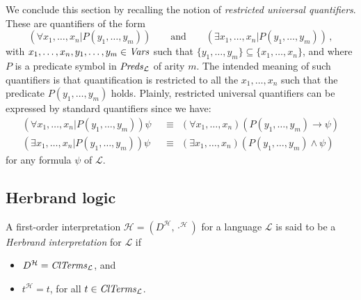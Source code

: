 \documentclass[a4paper]{llncs}
\newcommand{\Lang}{\ensuremath{\mathcal{L}\xspace}} %
\newcommand{\LangPreds}{\Preds_{\Lang}}
\newcommand{\LangClTerms}{\ClTerms_{\Lang}}
\newcommand{\hinter}{\ensuremath{\mathcal{H}}}
\begin{document}
We conclude this section by recalling the notion of \emph{restricted 
universal quantifiers}. These are quantifiers of the form
\[
  (\forall x_1, \ldots, x_n | P(y_1, \ldots, y_m)) \qquad \text{and} 
\qquad (\exists x_1, \ldots, x_n | P(y_1, \ldots, y_m))\,,
\]
with $x_1, \ldots, x_n, y_1, \ldots, y_m \in \mathit{Vars}$ such that
$\{y_1, \ldots, y_m\}\subseteq\{x_1, \ldots, x_n\}$,
and where $P$ is a predicate symbol in $\LangPreds$ of arity $m$.
%
The intended meaning of such quantifiers is that
quantification is restricted to all the $x_1, \ldots, x_n$ such that 
the predicate $P(y_1, \ldots, y_m)$ holds.
Plainly, restricted universal quantifiers can be expressed by 
standard quantifiers since we have:
\begin{align*}
(\forall x_1, \ldots, x_n | P(y_1, \ldots, y_m))\psi &~~\equiv~~
  (\forall x_1, \ldots, x_n)(P(y_1, \ldots, y_m)  \rightarrow \psi) \\
%
(\exists x_1, \ldots, x_n | P(y_1, \ldots, y_m))\psi &~~\equiv~~
  (\exists x_1, \ldots, x_n)(P(y_1, \ldots, y_m)  \wedge \psi)
\end{align*}
for any formula $\psi$ of $\Lang$.

\subsection{Herbrand logic}

A first-order interpretation $\hinter=(D^{\hinter},\cdot^\hinter)$
for a language $\Lang$
is said to be a \emph{Herbrand interpretation} for $\Lang$ if
\begin{itemize}
\item $D^{\hinter} = \LangClTerms$, and

\item $t^{\hinter} = t$,  for all $t \in \LangClTerms$.
\end{itemize}
%
%
\end{document}
